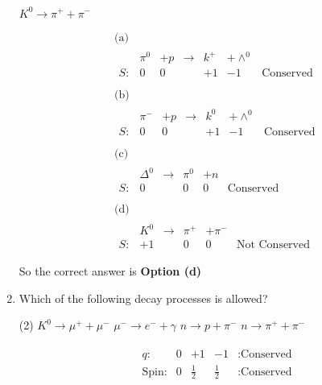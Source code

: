\begin{enumerate}
\begin{tasks}
		\task[\textbf{d.}] $K^0 \rightarrow \pi^{+}+\pi^{-}$
	\end{tasks}
	\begin{answer}
		\begin{align*}
		&\text{(a)}\\
		&\begin{array}{rrrrrrr} 
		&\pi^0&+p & \rightarrow & k^{+}&+\wedge^0&   \\
		S:&0&0& &+1&-1&\text{Conserved}\\
		\end{array}\\
		&\text{(b)}\\
		&\begin{array}{rrrrrrr} 
		&\pi^-&+p & \rightarrow & k^{0}&+\wedge^0&   \\
		S:&0&0& &+1&-1&\text{Conserved}\\
		\end{array}\\
		&\text{(c)}\\
		&\begin{array}{rrrrrrr} 
		&\Delta ^0& \rightarrow & \pi^{0}&+n&   \\
		S:&0& &0&0&\text{Conserved}\\
		\end{array}\\
		&\text{(d)}\\
		&\begin{array}{rrrrrrr} 
		&K ^0& \rightarrow & \pi^{+}&+\pi^-&   \\
		S:&+1& &0&0&\text{Not Conserved}\\
		\end{array}\\
		\end{align*}
		So the correct answer is \textbf{Option (d)}
	\end{answer}
	\item  Which of the following decay processes is allowed?
	\begin{tasks}(2)
		\task[\textbf{a.}]$K^0 \rightarrow \mu^{+}+\mu^{-}$
		\task[\textbf{b.}] $\mu^{-} \rightarrow e^{-}+\gamma$
		\task[\textbf{c.}]$n \rightarrow p+\pi^{-}$
		\task[\textbf{d.}] $n \rightarrow \pi^{+}+\pi^{-}$
	\end{tasks}
	\begin{answer}
		\begin{align*}
		&\begin{array}{lllll}
		q:&0&+1&-1&\text{:Conserved}\\
		\text{Spin:}&0&\frac{1}{2}&\frac{1}{2}&\text{:Conserved}\\

\end{array}
\end{align*}
\end{answer}
\end{enumerate}

